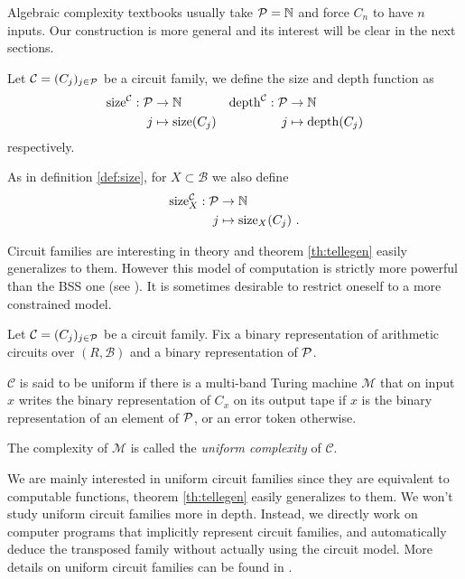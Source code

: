 Algebraic complexity textbooks usually take $\mathcal{P}=\mathbb{N}$ and force
$C_n$ to have $n$ inputs. Our construction is more general and its
interest will be clear in the next sections.

\begin{definition}
  Let $\mathcal{C} = (C_j)_{j\in\mathcal{P}}$ be a circuit family, we
  define the size and depth function as
  \begin{align*}
    \operatorname{size}^{\mathcal{C}}:\mathcal{P}&\rightarrow\mathbb{N}  & \operatorname{depth}^{\mathcal{C}}:\mathcal{P}&\rightarrow\mathbb{N}\\
                   j&\mapsto\operatorname{size}(C_j) &    j&\mapsto\operatorname{depth}(C_j)
  \end{align*}
  respectively.

  As in definition \ref{def:size}, for $X\subset\mathcal{B}$ we also
  define
  \begin{align*}
    \operatorname{size}^{\mathcal{C}}_X:\mathcal{P}&\rightarrow\mathbb{N}\\
                     j&\mapsto\operatorname{size}_X(C_j)
                     \text{ .}
  \end{align*}
\end{definition}

Circuit families are interesting in theory and theorem
\ref{th:tellegen} easily generalizes to them. However this model of
computation is strictly more powerful than the BSS one (see \cite[Obs.
2.3]{Vollmer}). It is sometimes desirable to restrict oneself to a
more constrained model.

\begin{definition}
  Let $\mathcal{C} = (C_j)_{j\in\mathcal{P}}$ be a circuit family. Fix a
  binary representation of arithmetic circuits over $(R,\mathcal{B})$
  and a binary representation of $\mathcal{P}$.

  $\mathcal{C}$ is said to be uniform if there is a multi-band Turing
  machine $\mathcal{M}$ that on input $x$ writes the binary
  representation of $C_x$ on its output tape if $x$ is the binary
  representation of an element of $\mathcal{P}$, or an error token otherwise.

  The complexity of $\mathcal{M}$ is called the \emph{uniform
    complexity} of $\mathcal{C}$.
\end{definition}

We are mainly interested in uniform circuit families since they are
equivalent to computable functions, theorem \ref{th:tellegen} easily
generalizes to them. We won't study uniform circuit families more in
depth. Instead, we directly work on computer programs that implicitly
represent circuit families, and automatically deduce the transposed
family without actually using the circuit model. More details on
uniform circuit families can be found in \cite{Vollmer}.



%
